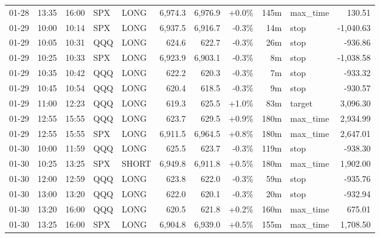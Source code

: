 \documentclass[11pt,a4paper,twoside]{article}
\begin{document}
\begin{center}
\begin{longtable}{>{\color{txtmain}}l l l l l r r r r >{\color{txtmain}}l r}
01-28 & 13:35 & 16:00 & SPX & LONG & 6,974.3 & 6,976.9 & \textcolor{wingreen}{+0.0\%} & 145m & max\_time & \textcolor{wingreen}{130.51} \\
01-29 & 10:00 & 10:14 & SPX & LONG & 6,937.5 & 6,916.7 & \textcolor{lossred}{-0.3\%} & 14m & stop & \textcolor{lossred}{-1,040.63} \\
01-29 & 10:05 & 10:31 & QQQ & LONG & 624.6 & 622.7 & \textcolor{lossred}{-0.3\%} & 26m & stop & \textcolor{lossred}{-936.86} \\
01-29 & 10:25 & 10:33 & SPX & LONG & 6,923.9 & 6,903.1 & \textcolor{lossred}{-0.3\%} & 8m & stop & \textcolor{lossred}{-1,038.58} \\
01-29 & 10:35 & 10:42 & QQQ & LONG & 622.2 & 620.3 & \textcolor{lossred}{-0.3\%} & 7m & stop & \textcolor{lossred}{-933.32} \\
01-29 & 10:45 & 10:54 & QQQ & LONG & 620.4 & 618.5 & \textcolor{lossred}{-0.3\%} & 9m & stop & \textcolor{lossred}{-930.57} \\
01-29 & 11:00 & 12:23 & QQQ & LONG & 619.3 & 625.5 & \textcolor{wingreen}{+1.0\%} & 83m & target & \textcolor{wingreen}{3,096.30} \\
01-29 & 12:55 & 15:55 & QQQ & LONG & 623.7 & 629.5 & \textcolor{wingreen}{+0.9\%} & 180m & max\_time & \textcolor{wingreen}{2,934.99} \\
01-29 & 12:55 & 15:55 & SPX & LONG & 6,911.5 & 6,964.5 & \textcolor{wingreen}{+0.8\%} & 180m & max\_time & \textcolor{wingreen}{2,647.01} \\
01-30 & 10:00 & 11:59 & QQQ & LONG & 625.5 & 623.7 & \textcolor{lossred}{-0.3\%} & 119m & stop & \textcolor{lossred}{-938.30} \\
01-30 & 10:25 & 13:25 & SPX & SHORT & 6,949.8 & 6,911.8 & \textcolor{wingreen}{+0.5\%} & 180m & max\_time & \textcolor{wingreen}{1,902.00} \\
01-30 & 12:00 & 12:59 & QQQ & LONG & 623.8 & 622.0 & \textcolor{lossred}{-0.3\%} & 59m & stop & \textcolor{lossred}{-935.76} \\
01-30 & 13:00 & 13:20 & QQQ & LONG & 622.0 & 620.1 & \textcolor{lossred}{-0.3\%} & 20m & stop & \textcolor{lossred}{-932.94} \\
01-30 & 13:20 & 16:00 & QQQ & LONG & 620.5 & 621.8 & \textcolor{wingreen}{+0.2\%} & 160m & max\_time & \textcolor{wingreen}{675.01} \\
01-30 & 13:25 & 16:00 & SPX & LONG & 6,904.8 & 6,939.0 & \textcolor{wingreen}{+0.5\%} & 155m & max\_time & \textcolor{wingreen}{1,708.50} \\

\end{longtable}
\end{center}
\end{document}
